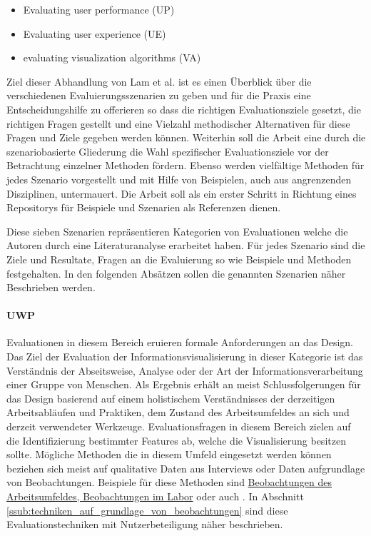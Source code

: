 \documentclass[draft=false
              ,paper=a4
              ,twoside=false
              ,fontsize=11pt
              ,headsepline
              ,BCOR10mm
              ,DIV11
              ]{scrbook}
\begin{document}
\begin{itemize}
  \item Evaluating user performance (UP)
  \item Evaluating user experience (UE)
  \item evaluating visualization algorithms (VA)
\end{itemize}

Ziel dieser Abhandlung von Lam et al. ist es einen Überblick über die verschiedenen Evaluierungsszenarien zu geben und für die Praxis eine Entscheidungshilfe zu offerieren so dass die richtigen Evaluationsziele gesetzt, die richtigen Fragen gestellt und eine Vielzahl methodischer Alternativen für diese Fragen und Ziele gegeben werden können. Weiterhin soll die Arbeit eine durch die szenariobasierte Gliederung die Wahl spezifischer Evaluationsziele vor der Betrachtung einzelner Methoden fördern. Ebenso werden vielfältige Methoden für jedes Szenario vorgestellt und mit Hilfe von Beispielen, auch aus angrenzenden Disziplinen, untermauert. Die Arbeit soll als ein erster Schritt in Richtung eines Repositorys für Beispiele und Szenarien als Referenzen dienen. 

Diese sieben Szenarien repräsentieren Kategorien von Evaluationen welche die Autoren durch eine Literaturanalyse erarbeitet haben. Für jedes Szenario sind die Ziele und Resultate, Fragen an die Evaluierung so wie Beispiele und Methoden festgehalten. In den folgenden Absätzen sollen die genannten Szenarien näher Beschrieben werden.

\paragraph{UWP} %
\label{par:uwp}
Evaluationen in diesem Bereich eruieren formale Anforderungen an das Design. Das Ziel der Evaluation der Informationsvisualisierung in dieser Kategorie ist das Verständnis der Abseitsweise, Analyse oder der Art der Informationsverarbeitung einer Gruppe von Menschen. Als Ergebnis erhält an meist Schlussfolgerungen für das Design basierend auf einem holistischem Verständnisses der derzeitigen Arbeitsabläufen und Praktiken, dem Zustand des Arbeitsumfeldes an sich und derzeit verwendeter Werkzeuge. Evaluationsfragen in diesem Bereich zielen auf die Identifizierung bestimmter Features ab, welche die Visualisierung besitzen sollte.
Mögliche Methoden die in diesem Umfeld eingesetzt werden können beziehen sich meist auf qualitative Daten aus Interviews oder Daten aufgrundlage von Beobachtungen. Beispiele für diese Methoden sind \hyperref[ssub:techniken_auf_grundlage_von_beobachtungen]{Beobachtungen des Arbeitsumfeldes, Beobachtungen im Labor} oder auch . In Abschnitt \ref{ssub:techniken_auf_grundlage_von_beobachtungen} sind diese Evaluationstechniken mit Nutzerbeteiligung näher beschrieben. 
\end{document}
